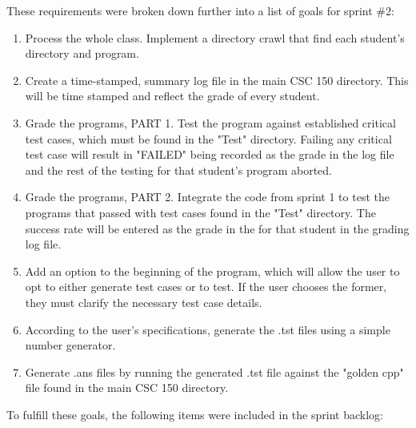 \noindent These requirements were broken down further into a list of goals for sprint \#2:

\begin{enumerate}
	\item Process the whole class. Implement a directory crawl that find each student's directory and program.
	\item Create a time-stamped, summary log file in the main CSC 150 directory. This will be time stamped and reflect the grade of every student.
	\item Grade the programs, PART 1. Test the program against established critical test cases, which must be found in the "Test" directory. Failing any critical test case will result in "FAILED" being recorded as the grade in the log file and the rest of the testing for that student's program aborted.
	\item Grade the programs, PART 2. Integrate the code from sprint 1 to test the programs that passed with test cases found in the "Test" directory. The success rate will be entered as the grade in the for that student in the grading log file.
	\item Add an option to the beginning of the program, which will allow the user to opt to either generate test cases or to test. If the user chooses the former, they must clarify the necessary test case details.
	\item According to the user's specifications, generate the .tst files using a simple number generator.
	\item Generate .ans files by running the generated .tst file against the "golden cpp" file found in the main CSC 150 directory.
	
\end{enumerate}

\noindent To fulfill these goals, the following items were included in the sprint backlog:

